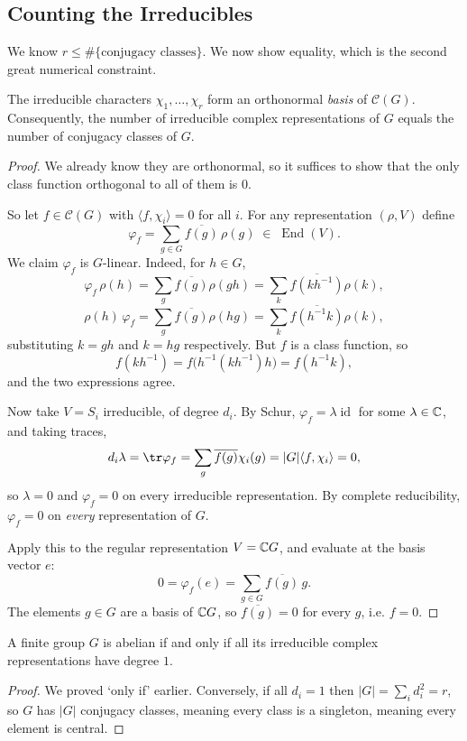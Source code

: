 \documentclass[a4paper]{scrartcl}
\newcommand{\End}{\operatorname{End}}
\newcommand{\id}{\operatorname{id}}
\newcommand{\ip}[2]{\langle #1, #2 \rangle}
\begin{document}
\subsection{Counting the Irreducibles}

We know $r \leq \#\{\text{conjugacy classes}\}$. We now show equality, which is the second great numerical constraint.

\begin{theorem}
	The irreducible characters $\chi_1, \dots, \chi_r$ form an orthonormal \emph{basis} of $\mathcal{C}(G)$. Consequently, the number of irreducible complex representations of $G$ equals the number of conjugacy classes of $G$.
\end{theorem}
\begin{proof}
	We already know they are orthonormal, so it suffices to show that the only class function orthogonal to all of them is $0$.

	So let $f \in \mathcal{C}(G)$ with $\ip{f}{\chi_i} = 0$ for all $i$. For any representation $(\rho, V)$ define
	$$\varphi_f = \sum_{g\in G}\overline{f(g)}\,\rho(g) \; \in \; \End(V).$$
	We claim $\varphi_f$ is $G$-linear. Indeed, for $h \in G$,
	$$\varphi_f\,\rho(h) = \sum_g \overline{f(g)}\rho(gh) = \sum_k \overline{f(kh^{-1})}\rho(k),$$
	$$\rho(h)\,\varphi_f = \sum_g \overline{f(g)}\rho(hg) = \sum_k\overline{f(h^{-1}k)}\rho(k),$$
	substituting $k = gh$ and $k = hg$ respectively. But $f$ is a class function, so
	$$f(kh^{-1}) = f\big(h^{-1}(kh^{-1})h\big) = f(h^{-1}k),$$
	and the two expressions agree.

	Now take $V = S_i$ irreducible, of degree $d_i$. By Schur, $\varphi_f = \lambda\id$ for some $\lambda \in \mathbb{C}$, and taking traces,
	$$d_i \lambda = \tr\varphi_f = \sum_g \overline{f(g)}\chi_i(g) = |G|\ip{f}{\chi_i} = 0,$$
	so $\lambda = 0$ and $\varphi_f = 0$ on every irreducible representation. By complete reducibility, $\varphi_f = 0$ on \emph{every} representation of $G$.

	Apply this to the regular representation $V = \mathbb{C} G$, and evaluate at the basis vector $e$:
	$$0 = \varphi_f(e) = \sum_{g\in G}\overline{f(g)}\, g.$$
	The elements $g \in G$ are a basis of $\mathbb{C} G$, so $\overline{f(g)} = 0$ for every $g$, i.e. $f = 0$.
\end{proof}

\begin{corollary}
	A finite group $G$ is abelian if and only if all its irreducible complex representations have degree $1$.
\end{corollary}
\begin{proof}
	We proved `only if' earlier. Conversely, if all $d_i = 1$ then $|G| = \sum_i d_i^2 = r$, so $G$ has $|G|$ conjugacy classes, meaning every class is a singleton, meaning every element is central.
\end{proof}
\end{document}

